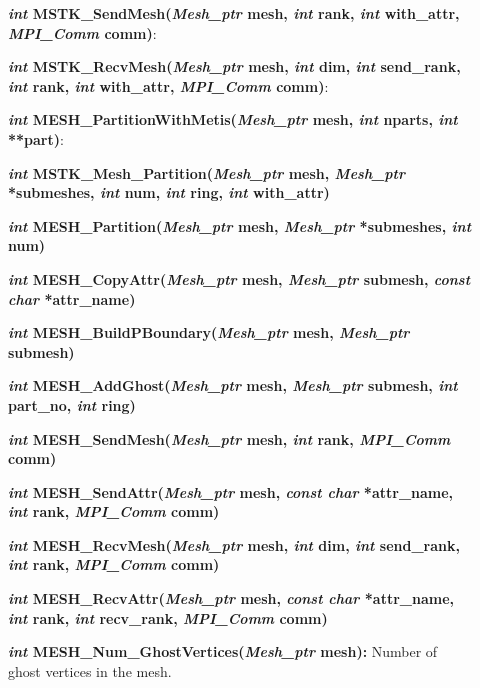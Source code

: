 \documentclass[12pt]{article}
\begin{document}
\begin{description}

  \item[] {\bf {\em int} MSTK\_SendMesh({\em Mesh\_ptr} mesh, {\em int} rank, {\em int} with\_attr, {\em MPI\_Comm} comm)}:

  \item[] {\bf {\em int} MSTK\_RecvMesh({\em Mesh\_ptr} mesh, {\em int} dim, {\em int} send\_rank, {\em int} rank, {\em int} with\_attr, {\em MPI\_Comm} comm)}:


  \item[] {\bf {\em int} MESH\_PartitionWithMetis({\em Mesh\_ptr} mesh, {\em int} nparts, {\em int} **part)}:
  \item[] {\bf {\em int}        MSTK\_Mesh\_Partition({\em Mesh\_ptr} mesh, {\em Mesh\_ptr} *submeshes, {\em int} num, 				 {\em int} ring, {\em int} with\_attr)}
  \item[] {\bf {\em int}        MESH\_Partition({\em Mesh\_ptr} mesh, {\em Mesh\_ptr} *submeshes, {\em int} num)}
  \item[] {\bf {\em int}        MESH\_CopyAttr({\em Mesh\_ptr} mesh, {\em Mesh\_ptr} submesh, {\em const char} *attr\_name)}


  \item[] {\bf {\em int}        MESH\_BuildPBoundary({\em Mesh\_ptr} mesh, {\em Mesh\_ptr} submesh)}


  \item[] {\bf {\em int}        MESH\_AddGhost({\em Mesh\_ptr} mesh, {\em Mesh\_ptr} submesh, {\em int} part\_no, {\em int} ring)}

  \item[] {\bf {\em int}        MESH\_SendMesh({\em Mesh\_ptr} mesh, {\em int} rank, {\em MPI\_Comm} comm)}
  \item[] {\bf {\em int}        MESH\_SendAttr({\em Mesh\_ptr} mesh, {\em const char} *attr\_name, {\em int} rank, {\em MPI\_Comm} comm)}
  \item[] {\bf {\em int}        MESH\_RecvMesh({\em Mesh\_ptr} mesh, {\em int} dim, {\em int} send\_rank, {\em int} rank, {\em MPI\_Comm} comm)}
  \item[] {\bf {\em int}        MESH\_RecvAttr({\em Mesh\_ptr} mesh, {\em const char} *attr\_name, {\em int} rank, {\em int} recv\_rank, {\em MPI\_Comm} comm)}


  \item[]{\bf {\em int} MESH\_Num\_GhostVertices({\em Mesh\_ptr} mesh):}
    Number of ghost vertices in the mesh.


\end{description}
\end{document}
